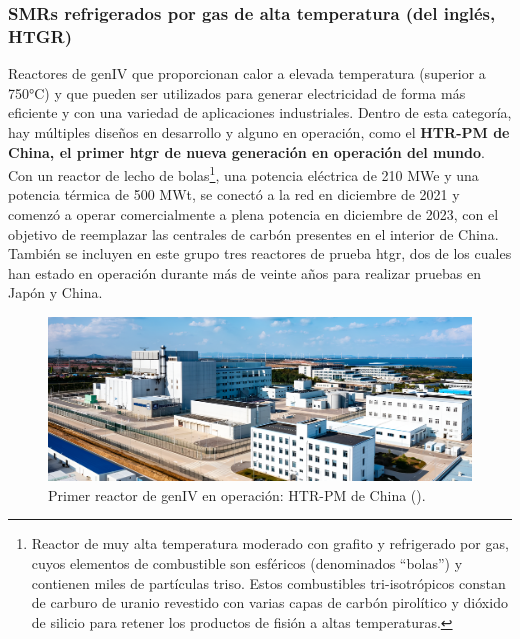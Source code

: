 \subsubsection{SMRs refrigerados por gas de alta temperatura (del inglés, HTGR)}

Reactores de \acrshort{genIV} que proporcionan calor a elevada temperatura (superior a 750°C) y que pueden ser utilizados para generar electricidad de forma más eficiente y con una variedad de aplicaciones industriales. Dentro de esta categoría, hay múltiples diseños en desarrollo y alguno en operación, como el \textbf{HTR-PM de China, el primer \acrshort{htgr} de nueva generación en operación del mundo}. Con un \gls{reactor de lecho de bolas}\footnote{Reactor de muy alta temperatura moderado con grafito y refrigerado por gas, cuyos elementos de combustible son esféricos (denominados ``bolas'') y contienen miles de partículas \acrshort{triso}. Estos combustibles tri-isotrópicos constan de carburo de uranio revestido con varias capas de carbón pirolítico y dióxido de silicio para retener los productos de fisión a altas temperaturas.}, una potencia eléctrica de 210 MWe y una potencia térmica de 500 MWt, se conectó a la red en diciembre de 2021 y comenzó a operar comercialmente a plena potencia en diciembre de 2023, con el objetivo de reemplazar las centrales de carbón presentes en el interior de China. También se incluyen en este grupo tres reactores de prueba \acrshort{htgr}, dos de los cuales han estado en operación durante más de veinte años para realizar pruebas en Japón y China.

\begin{figure}[h]
  \centering
  \includegraphics[width=\textwidth]{content/figures/HTR_PM_china.png}
  \caption{Primer reactor de \acrshort{genIV} en operación: HTR-PM de China (\cite{htr_pm_china}).}
  \label{fig:htr_pm_china}
\end{figure}

